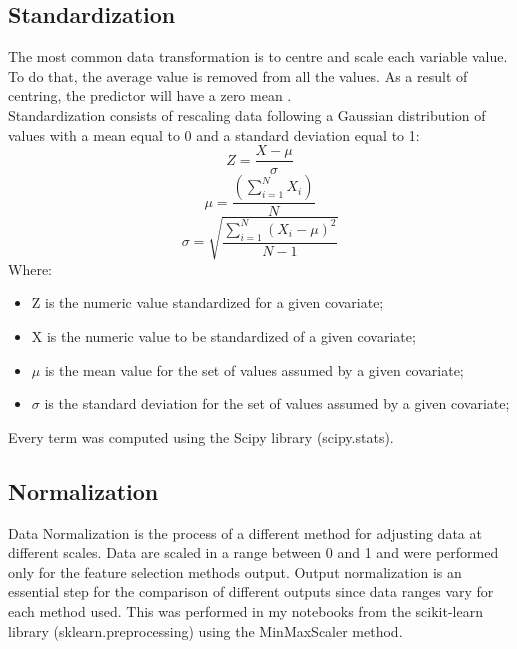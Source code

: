 \subsection{Standardization}
The most common data transformation is to centre and scale each variable value. To do that, the average value is removed from all the values. As a result of centring, the predictor will have a zero mean \cite{kuhn2013applied}.\\
Standardization consists of rescaling data following a Gaussian distribution of values with a mean equal to 0 and a standard deviation equal to 1:
\begin{equation}
  Z = \frac{X-\mu}{\sigma}
\end{equation}
\begin{equation}
\mu = \frac{(\sum_{i=1}^{N} X_i)}{N}
\end{equation}
\begin{equation}
\sigma = \sqrt{\frac{\sum_{i=1}^{N} (X_i-\mu)^{2}}{N-1}}
\end{equation}
Where:
\begin{itemize}
\item Z is the numeric value standardized for a given covariate;
\item X is the numeric value to be standardized of a given covariate;
\item $\mu$ is the mean value for the set of values assumed by a given covariate;
\item $\sigma$ is the standard deviation for the set of values assumed by a given covariate;
\end{itemize}
Every term was computed using the Scipy library (scipy.stats). 
\bigbreak
\subsection{Normalization}
Data Normalization is the process of a different method for adjusting data at different scales. Data are scaled in a range between 0 and 1 and were performed only for the feature selection methods output.
Output normalization is an essential step for the comparison of different outputs since data ranges vary for each method used.\newline
This was performed in my notebooks from the scikit-learn library (sklearn.preprocessing) using the MinMaxScaler method.
